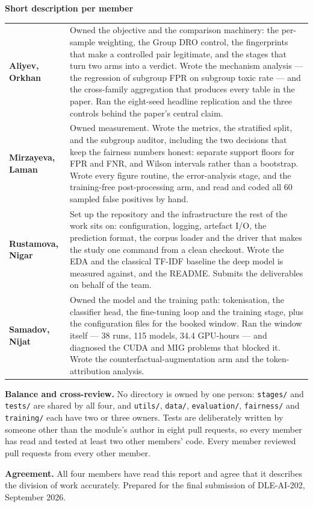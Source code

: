 \documentclass[10pt]{article}
\begin{document}
\newpage

{\normalsize\bfseries\color{fairblue} Short description per member}

\vspace{0.5em}
\footnotesize
\begin{tabular}{%
  >{\raggedright\arraybackslash}p{}
  >{\raggedright\arraybackslash}p{}}
\textbf{Aliyev, Orkhan} &
Owned the objective and the comparison machinery: the per-sample weighting, the
Group DRO control, the fingerprints that make a controlled pair legitimate, and
the stages that turn two arms into a verdict. Wrote the mechanism analysis --- the
regression of subgroup FPR on subgroup toxic rate --- and the cross-family
aggregation that produces every table in the paper. Ran the eight-seed headline
replication and the three controls behind the paper's central claim. \\
\addlinespace
\textbf{Mirzayeva, Laman} &
Owned measurement. Wrote the metrics, the stratified split, and the subgroup
auditor, including the two decisions that keep the fairness numbers honest:
separate support floors for FPR and FNR, and Wilson intervals rather than a
bootstrap. Wrote every figure routine, the error-analysis stage, and the
training-free post-processing arm, and read and coded all 60 sampled false
positives by hand. \\
\addlinespace
\textbf{Rustamova, Nigar} &
Set up the repository and the infrastructure the rest of the work sits on:
configuration, logging, artefact I/O, the prediction format, the corpus loader
and the driver that makes the study one command from a clean checkout. Wrote
the EDA and the classical TF-IDF baseline the deep model is measured against,
and the README. Submits the deliverables on behalf of the team. \\
\addlinespace
\textbf{Samadov, Nijat} &
Owned the model and the training path: tokenisation, the classifier head, the
fine-tuning loop and the training stage, plus the configuration files for the
booked window. Ran the window itself --- 38 runs, 115 models, 34.4 GPU-hours ---
and diagnosed the CUDA and MIG problems that blocked it. Wrote the
counterfactual-augmentation arm and the token-attribution analysis. \\
\end{tabular}

\vspace{1.6em}

{\footnotesize
\textbf{Balance and cross-review.} No directory is owned by one person:
\texttt{stages/} and \texttt{tests/} are shared by all four, and
\texttt{utils/}, \texttt{data/}, \texttt{evaluation/}, \texttt{fairness/} and
\texttt{training/} each have two or three owners. Tests are deliberately written
by someone other than the module's author in eight pull requests, so every
member has read and tested at least two other members' code. Every member
reviewed pull requests from every other member.

\vspace{0.6em}
\textbf{Agreement.} All four members have read this report and agree that it
describes the division of work accurately. Prepared for the final submission of
DLE-AI-202, September 2026.}
\end{document}
